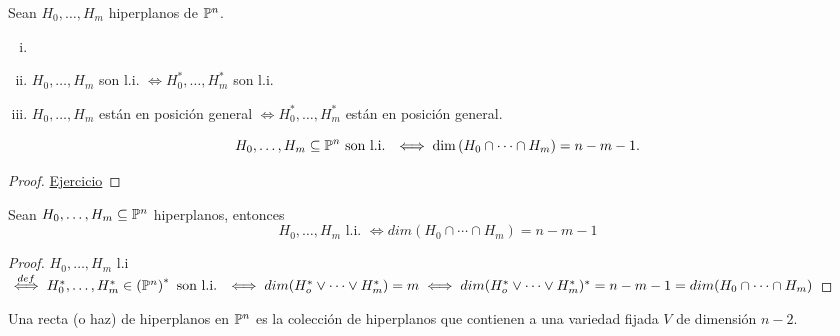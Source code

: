 \begin{defi}
    Sean $H_0, \dots, H_m$ hiperplanos de $\mathbb{P}^n$.
    \begin{enumerate}[(i)]
        \item[]
        \item $H_0, \dots, H_m$ son l.i. $\iff H_0^*, \dots, H_m^*$ son l.i.
        \item $H_0, \dots, H_m$ están en posición general $\iff H_0^*, \dots, H_m^*$ están en posición general.
    \end{enumerate}
\end{defi}
\begin{prop}
    \[
        H_0, \dots, H_m \subseteq \mathbb{P}^n \text{ son l.i. } \iff \dim \left( H_0 \cap \cdots \cap H_m \right) = n-m-1.
    \]
\end{prop}
\begin{proof}
    \underline{Ejercicio}
\end{proof}


\begin{prop}
    Sean $H_0,\dots,H_m \subseteq \mathbb{P}^n$ hiperplanos, entonces
    \[
        H_0,\dots, H_m \text{ l.i. } \iff dim(H_0 \cap \cdots \cap H_m) = n - m - 1
    \]
\end{prop}
\begin{proof}
    $H_0,\dots,H_m$ l.i $\stackrel{def}{\iff} H_0^*,\dots,H_m^* \in \left(\mathbb{P}^n\right)^* \text{ son l.i. }
    \iff dim(H_o^* \vee \cdots \vee H_m^*) = m \iff dim(H_o^* \vee \cdots \vee H_m^*)^* = n - m-1
    = dim(H_0 \cap \cdots \cap H_m)$
\end{proof}

\begin{defi}
    Una recta (o haz) de hiperplanos en $\mathbb{P}^n$ es la colección de hiperplanos que contienen a una variedad
    fijada $V$ de dimensión $n-2$.
\end{defi}


